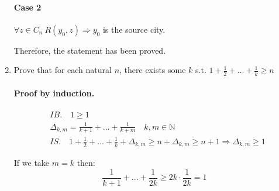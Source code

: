 \documentclass{article}
\begin{document}
\begin{enumerate}
\paragraph{Case 2}
$\forall z \in C_n \: R(y_0, z) \Rightarrow y_0 $ is the source city.

Therefore, the statement has been proved.

\item Prove that for each natural $n$, there exists some $k$ s.t. $1 + \frac{1}{2} + ... + \frac{1}{k} \geq n$

\paragraph{Proof by induction.}
\begin{align*}
&IB. \quad 1 \geq 1\\
&\Delta_{k,m} = \frac{1}{k+1} + ... + \frac{1}{k+m} \quad k, m \in \mathbb{N}\\
&IS. \quad 1 + \frac{1}{2} + ... + \frac{1}{k} + \Delta_{k,m} \geq n + \Delta_{k,m} \geq n + 1 \Rightarrow \Delta_{k,m} \geq 1
\end{align*}

If we take $m = k$ then:
\[\frac{1}{k+1} + ... + \frac{1}{2k} \geq 2k \cdot \frac{1}{2k} = 1\]

\end{enumerate}
\end{document}
